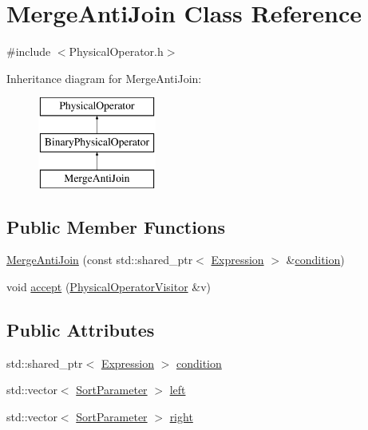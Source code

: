 \hypertarget{class_merge_anti_join}{\section{Merge\+Anti\+Join Class Reference}
\label{class_merge_anti_join}
}


{\ttfamily \#include $<$Physical\+Operator.\+h$>$}

Inheritance diagram for Merge\+Anti\+Join\+:\begin{figure}[H]
\begin{center}
\leavevmode
\includegraphics[height=3.000000cm]{class_merge_anti_join}
\end{center}
\end{figure}
\subsection*{Public Member Functions}
\begin{DoxyCompactItemize}
\item 
\hyperlink{class_merge_anti_join_a314a1c84c2b6c6848f5f4664c2b13c77}{Merge\+Anti\+Join} (const std\+::shared\+\_\+ptr$<$ \hyperlink{class_expression}{Expression} $>$ \&\hyperlink{class_merge_anti_join_ae616cc88814ffd21b31ed48693ac60a6}{condition})
\item 
void \hyperlink{class_merge_anti_join_a15758e7f808703b243101faa382a0156}{accept} (\hyperlink{class_physical_operator_visitor}{Physical\+Operator\+Visitor} \&v)
\end{DoxyCompactItemize}
\subsection*{Public Attributes}
\begin{DoxyCompactItemize}
\item 
std\+::shared\+\_\+ptr$<$ \hyperlink{class_expression}{Expression} $>$ \hyperlink{class_merge_anti_join_ae616cc88814ffd21b31ed48693ac60a6}{condition}
\item 
std\+::vector$<$ \hyperlink{class_sort_parameter}{Sort\+Parameter} $>$ \hyperlink{class_merge_anti_join_a1dedfa039b1172db367fc7d3cd0304fc}{left}
\item 
std\+::vector$<$ \hyperlink{class_sort_parameter}{Sort\+Parameter} $>$ \hyperlink{class_merge_anti_join_a28f20cf708052a9357799187831c8a33}{right}
\end{DoxyCompactItemize}


